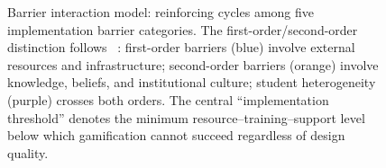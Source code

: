 \begin{figure}[!h]
{%
}%
\caption{Barrier interaction model: reinforcing cycles among five implementation barrier categories. The first-order/second-order distinction follows \citeauthor{Ertmer1999}~\cite{Ertmer1999}: first-order barriers (blue) involve external resources and infrastructure; second-order barriers (orange) involve knowledge, beliefs, and institutional culture; student heterogeneity (purple) crosses both orders. The central ``implementation threshold'' denotes the minimum resource--training--support level below which gamification cannot succeed regardless of design quality.}
\label{fig:barrier-interaction-model}
\end{figure}
